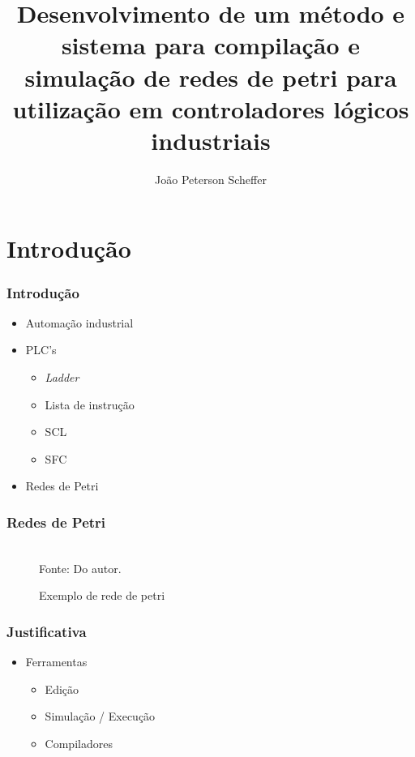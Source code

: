 \documentclass{beamer}
\title{Desenvolvimento de um método e sistema para compilação e simulação de redes de petri para utilização em controladores lógicos industriais}
\author{João Peterson Scheffer}
\newcommand{\incsvg}[2]{%
	\def\svgwidth{\columnwidth}
	\graphicspath{{#1}}
	
}
\begin{document}
\maketitle

\section{Introdução}

\begin{frame}
\frametitle{Introdução}

	\begin{itemize}
		\item Automação industrial
		\item PLC's 
		\begin{itemize}
			\item \textit{Ladder}
			\item Lista de instrução
			\item SCL
			\item SFC
		\end{itemize}
		\item Redes de Petri
	\end{itemize}
\end{frame}

\begin{frame}
\frametitle{Redes de Petri}

\begin{figure}[ht]
	\centering
	\caption{Exemplo de rede de petri}
	\scriptsize
	\incsvg{images}{images/pnetcomp}\\
	\label{fig:pnetcomp}
	\footnotesize{Fonte: Do autor.}
\end{figure}
\end{frame}

\begin{frame}
\frametitle{Justificativa}

	\begin{itemize}
		\item Ferramentas
		\begin{itemize}
			\item Edição 
			\item Simulação / Execução
			\item Compiladores
		\end{itemize}
	\end{itemize}
\end{frame}
\end{document}

